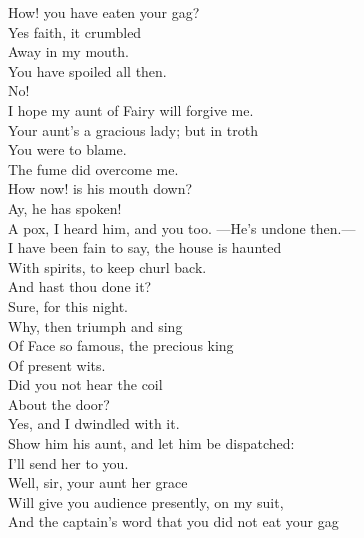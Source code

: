 \documentclass[a4paper,oneside,12pt]{memoir}
\begin{document}
\begin{drama*}
\subtlespeaks How! you have eaten your gag?\\
\dapperspeaks {} Yes faith, it crumbled\\
Away in my mouth.\\
\subtlespeaks {} You have spoiled all then.\\
\dapperspeaks {} No!\\
I hope my aunt of Fairy will forgive me.\\
\subtlespeaks Your aunt's a gracious lady; but in troth\\
You were to blame.\\
\dapperspeaks {} The fume did overcome me.\\
\facespeaks How now! is his mouth down?\\
\subtlespeaks {} Ay, he has spoken!\\
\facespeaks A pox, I heard him, and you too. ---He's undone then.---\\
I have been fain to say, the house is haunted\\
With spirits, to keep churl back.\\
\subtlespeaks {} And hast thou done it?\\
\facespeaks Sure, for this night.\\
\subtlespeaks {} Why, then triumph and sing\\
Of Face so famous, the precious king\\
Of present wits.\\
\facespeaks {} Did you not hear the coil\\
About the door?\\
\subtlespeaks {} Yes, and I dwindled with it.\\
\facespeaks Show him his aunt, and let him be dispatched:\\
I'll send her to you.\\
\subtlespeaks {} Well, sir, your aunt her grace\\
Will give you audience presently, on my suit,\\
And the captain's word that you did not eat your gag\\

\end{drama*}
\end{document}
